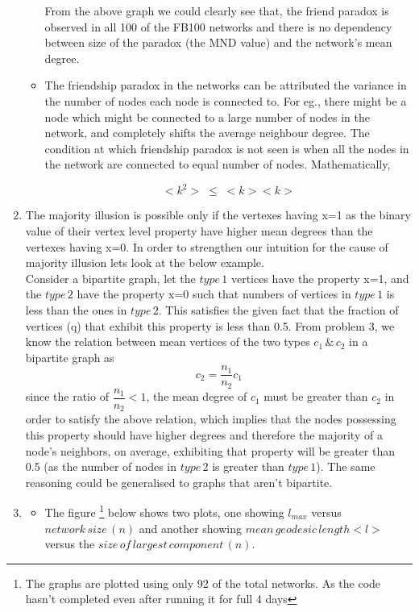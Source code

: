 \documentclass{article}
\begin{document}
\begin{enumerate}[label=(\alph*)]
\begin{itemize}
From the above graph we could clearly see that, the friend paradox is observed in all 100 of the FB100 networks  and there is no dependency between size of the paradox (the MND value) and the network’s mean degree.
\bigskip
\item
The friendship paradox in the networks can be attributed the variance in the number of nodes each node is connected to. For eg., there might be a node which might be connected to a large number of nodes in the network, and completely shifts the average neighbour degree. The condition at which friendship paradox is not seen is when all the nodes in the network are connected to equal number of nodes. Mathematically,

$$<k^2>\;\leq\;<k><k>$$

\end{itemize}
\item
The majority illusion is possible only if the vertexes having x=1 as the binary value of their vertex level property have higher mean degrees than the vertexes having x=0. In order to strengthen our intuition for the cause of majority illusion lets look at the below example. \medskip\\Consider a bipartite graph, let the $type\,1$ vertices have the property x=1, and the $type\,2$ have the property x=0 such that numbers of vertices in $type\,1$ is less than the ones in $type\,2$. This satisfies the given fact that the fraction of vertices (q) that exhibit this property is less than 0.5. From problem 3, we know the relation between mean vertices of the two types $c_1\,\&\,c_2$ in a bipartite graph as 
$$c_2 = \dfrac{n_1}{n_2} c_1$$
since the ratio of $\dfrac{n_1}{n_2} < 1$, the mean degree of $c_1$ must be greater than $c_2$ in order to satisfy the above relation, which implies that the nodes possessing this property should have higher degrees and therefore the majority of a node’s neighbors, on average, exhibiting that property will be greater than 0.5 (as the number of nodes in $type\,2$ is greater than $type\,1$). The same reasoning could be generalised to graphs that aren't bipartite.
\newpage
\item

\begin{itemize}
\item
The figure \footnote{The graphs are plotted using only 92 of the total networks. As the code hasn't completed even after running it for full 4 days} below shows two plots, one showing $l_{max}$ versus $network\,size\,(n)$ and another showing $mean\,geodesic\,length <l>$ versus the $size\,of\,largest\,component\,(n)$.


\end{itemize}
\end{enumerate}
\end{document}
